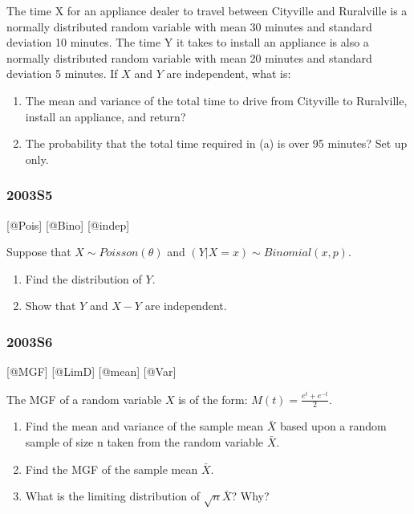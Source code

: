 \documentclass[6pt,twocolumn,Portrait]{article}
\begin{document}
The time X for an appliance dealer to travel between Cityville and
Ruralville is a normally distributed random variable with mean 30
minutes and standard deviation 10 minutes. The time Y it takes to
install an appliance is also a normally distributed random variable with
mean 20 minutes and standard deviation 5 minutes. If \(X\) and \(Y\) are
independent, what is:

\begin{enumerate}
\def\labelenumi{\Alph{enumi})}
\item
  The mean and variance of the total time to drive from Cityville to
  Ruralville, install an appliance, and return?
\item
  The probability that the total time required in (a) is over 95
  minutes? Set up only.
\end{enumerate}

\hypertarget{s5}{%
\subsubsection{2003S5}\label{s5}}

{[}@Pois{]} {[}@Bino{]} {[}@indep{]}

Suppose that \(X\sim Poisson(\theta)\) and
\((Y|X=x)\sim Binomial(x,p)\).

\begin{enumerate}
\def\labelenumi{\Alph{enumi})}
\item
  Find the distribution of \(Y\).
\item
  Show that \(Y\) and \(X-Y\) are independent.
\end{enumerate}

\hypertarget{s6}{%
\subsubsection{2003S6}\label{s6}}

{[}@MGF{]} {[}@LimD{]} {[}@mean{]} {[}@Var{]}

The MGF of a random variable \(X\) is of the form:
\(M(t)=\frac{e^t+e^{-t}}2\).

\begin{enumerate}
\def\labelenumi{\Alph{enumi})}
\item
  Find the mean and variance of the sample mean \(\bar X\) based upon a
  random sample of size n taken from the random variable \(\bar X\).
\item
  Find the MGF of the sample mean \(\bar X\).
\item
  What is the limiting distribution of \(\sqrt{n}\bar X\)? Why?
\end{enumerate}
\end{document}
